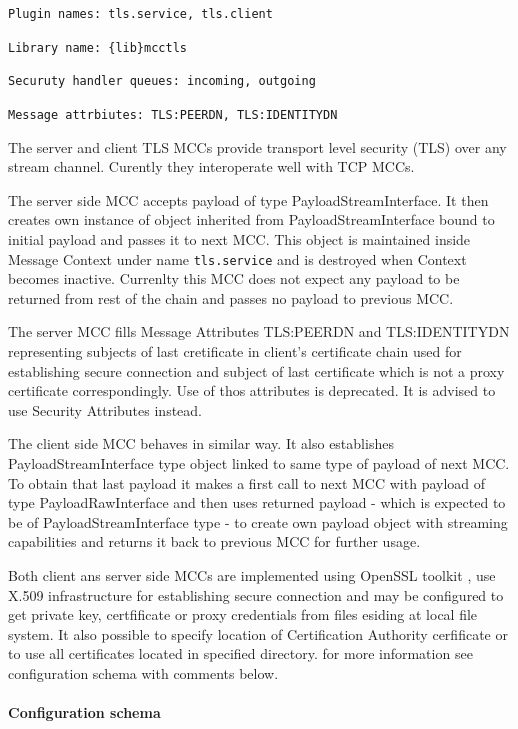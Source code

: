 \documentclass{book}
\begin{document}
\texttt{Plugin names: tls.service, tls.client}

\texttt{Library name: \{lib\}mcctls}

\texttt{Securuty handler queues: incoming, outgoing}

\texttt{Message attrbiutes: TLS:PEERDN, TLS:IDENTITYDN}


The server and client TLS MCCs provide transport level security (TLS) over any stream channel. Curently they interoperate well with TCP MCCs.

The server side MCC accepts payload of type PayloadStreamInterface. It then creates own instance of object inherited from PayloadStreamInterface bound to initial payload and passes it to next MCC. This object is maintained inside Message Context under name \texttt{tls.service} and is destroyed when Context becomes inactive. Currenlty this MCC does not expect any payload to be returned from rest of the chain and passes no payload to previous MCC.

The server MCC fills Message Attributes TLS:PEERDN and TLS:IDENTITYDN representing subjects of last cretificate in client's certificate chain used for establishing secure connection and subject of last certificate which is not a proxy certificate correspondingly. Use of thos attributes is deprecated. It is advised to use Security Attributes instead.

The client side MCC behaves in similar way. It also establishes PayloadStreamInterface type object linked to same type of payload of next MCC. To obtain that last payload it makes a first call to next MCC with payload of type PayloadRawInterface and then uses returned payload - which is expected to be of PayloadStreamInterface type - to create own payload object with streaming capabilities and returns it back to previous MCC for further usage.

Both client ans server side MCCs are implemented using OpenSSL toolkit \cite{openssl}, use X.509 infrastructure \cite{x509} for establishing secure connection and may be configured to get private key, certfificate or proxy credentials from files esiding at local file system. It also possible to specify location of Certification Authority cerfificate or to use all certificates located in specified directory. for more information see configuration schema with comments below.


\paragraph{Configuration schema}
\end{document}
